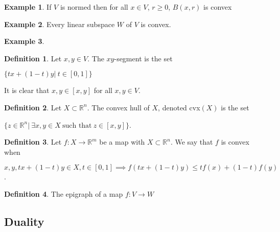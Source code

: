 \documentclass[]{article}
\theoremstyle{definition}
\newtheorem{definition}{Definition}[section]
\theoremstyle{definition}
\newtheorem{exmp}{Example}[section]
\newcommand{\raw}{\rightarrow}
\newcommand{\bb}{\mathbb}
\begin{document}
		
		
		\begin{exmp}
			If $V$ is normed then for all $x \in V$, $r \geq 0$, $B(x,r)$ is convex			
		\end{exmp}
	
	
		\begin{exmp}
			Every linear subspace $W$ of $V$ is convex.
		\end{exmp}

		\begin{exmp}
			
		\end{exmp}

		\begin{definition}
			Let $x, y \in V$. The $xy$-segment is the set 
			
			\begin{center}
				$\{ tx + (1-t)y| \ t \in [0, 1] \}$
			\end{center}
		\end{definition}

		It is clear that $x, y \in [x, y]$ for all $x, y \in V$.


		\begin{definition}
			Let $X \subset \bb{R}^n$. The convex hull of $X$, denoted cvx$(X)$ is the set 
			
			\begin{center}
				$\{ z \in \bb{R}^n| \ \exists x, y \in X \ \text{such that}\  z \in [x, y] \}$.
			\end{center}
		\end{definition}

		
		\begin{definition}
			Let $f: X \raw \bb{R}^m$ be a map with $X \subset \bb{R}^n$. We say that $f$ is convex when
			
			\begin{center}
				$x, y, tx + (1-t)y \in X, t \in [0, 1]  \implies f(tx + (1-t)y) \leq tf(x) + (1-t)f(y)$.
			\end{center}
			
		\end{definition}

		\begin{definition}
			The epigraph of a map $f: V \raw W$
		\end{definition}


		\subsection{Duality}
		\subsection{}
	
\end{document}
